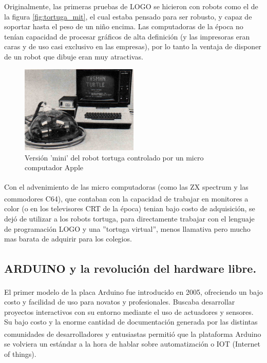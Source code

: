 Originalmente, las primeras pruebas de LOGO se hicieron con robots como el de la figura \ref{fig:tortuga_mit}, el cual estaba pensado para ser robusto, y capaz de soportar hasta el peso de un niño encima. Las computadoras de la época no tenían capacidad de procesar gráficos de alta definición (y las impresoras eran caras y de uso casi exclusivo en las empresas), por lo tanto la ventaja de disponer de un robot que dibuje eran muy atractivas.

\begin{figure}
  \begin{center}
    \includegraphics[width=0.5\textwidth]{figuras/turtle_with_apple.JPG}
    \caption[Caption for LOF]{Versión 'mini' del robot tortuga controlado por un micro computador Apple}
    
    \label{fig:tortuga_2}
  \end{center}
\end{figure}

Con el advenimiento de las micro computadoras (como las ZX spectrum\textsuperscript{\texttrademark}  y las commodores\textsuperscript{\texttrademark} C64), que contaban con la capacidad de trabajar  en monitores a color (o en los televisores CRT de la época) tenian bajo costo de adquisición, se dejó de utilizar a los robots tortuga, para directamente trabajar con el lenguaje de programación LOGO y una ''tortuga virtual'', menos llamativa pero mucho mas barata de adquirir para los colegios. 

\subsection{ARDUINO\textsuperscript{\texttrademark} y la revolución del hardware libre.} 


El primer modelo de la placa Arduino\textsuperscript{\texttrademark} fue introducido en 2005, ofreciendo un bajo costo y facilidad de uso para novatos y profesionales. Buscaba desarrollar proyectos interactivos con su entorno mediante el uso de actuadores y sensores. Su bajo costo y la enorme cantidad de documentación generada por las distintas comunidades de desarrolladores y entusiastas permitió que la plataforma Arduino\textsuperscript{\texttrademark} se volviera un estándar a la hora de hablar sobre automatización o IOT (Internet of things).

